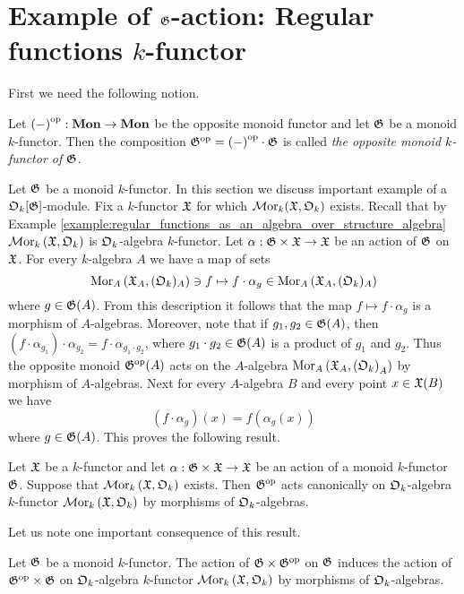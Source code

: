 \section{Example of ${\mathfrak G}$-action: Regular functions $k$-functor}
\noindent
First we need the following notion.

\begin{definition}
Let $\left(-\right)^{\mathrm{op}}:\mathbf{Mon} \rightarrow \mathbf{Mon}$ be the opposite monoid functor and let ${\mathfrak G}$ be a monoid $k$-functor. Then the composition ${\mathfrak G}^{\mathrm{op}} = \left(-\right)^{\mathrm{op}}\cdot {\mathfrak G}$ is called \textit{the opposite monoid $k$-functor of ${\mathfrak G}$}.
\end{definition}
\noindent
Let ${\mathfrak G}$ be a monoid $k$-functor. In this section we discuss important example of a ${\mathfrak O}_k[{\mathfrak G}]$-module. Fix a $k$-functor ${\mathfrak X}$ for which $\mathcal{M}\mathrm{or}_k({\mathfrak X},{\mathfrak O}_k)$ exists. Recall that by Example \ref{example:regular_functions_as_an_algebra_over_structure_algebra} $\mathcal{M}\mathrm{or}_k\left({\mathfrak X},{\mathfrak O}_k\right)$ is ${\mathfrak O}_k$-algebra $k$-functor. Let $\alpha:{\mathfrak G}\times {\mathfrak X}\rightarrow {\mathfrak X}$ be an action of ${\mathfrak G}$ on ${\mathfrak X}$. For every $k$-algebra $A$ we have a map of sets
$$\mathrm{Mor}_A\left({\mathfrak X}_A,({\mathfrak O}_k)_A\right) \ni f\mapsto f\cdot \alpha_{g}\in \mathrm{Mor}_A\left({\mathfrak X}_A,({\mathfrak O}_k)_A\right)$$
where $g\in {\mathfrak G}(A)$. From this description it follows that the map $f\mapsto f\cdot \alpha_{g}$ is a morphism of $A$-algebras. Moreover, note that if $g_1,g_2\in {\mathfrak G}(A)$, then $\left(f\cdot \alpha_{g_1}\right)\cdot \alpha_{g_2} = f\cdot \alpha_{g_1\cdot g_2}$, where $g_1\cdot g_2 \in {\mathfrak G}(A)$ is a product of $g_1$ and $g_2$. Thus the opposite monoid ${\mathfrak G}^{\mathrm{op}}(A)$ acts on the $A$-algebra $\mathrm{Mor}_A\left({\mathfrak X}_A,\left({\mathfrak O}_k\right)_A\right)$ by morphism of $A$-algebras. Next for every $A$-algebra $B$ and every point $x\in {\mathfrak X}(B)$ we have
$$(f\cdot \alpha_{g})(x) = f\left(\alpha_{g}(x)\right)$$
where $g\in {\mathfrak G}(A)$. This proves the following result.

\begin{proposition}\label{proposition:action_on_regular_k_functor}
Let ${\mathfrak X}$ be a $k$-functor and let $\alpha:{\mathfrak G}\times {\mathfrak X} \rightarrow {\mathfrak X}$ be an action of a monoid $k$-functor ${\mathfrak G}$. Suppose that $\mathcal{M}\mathrm{or}_k\left({\mathfrak X},{\mathfrak O}_k\right)$ exists. Then ${\mathfrak G}^{\mathrm{op}}$ acts canonically on ${\mathfrak O}_k$-algebra $k$-functor $\mathcal{M}\mathrm{or}_k\left({\mathfrak X},{\mathfrak O}_k\right)$ by morphisms of ${\mathfrak O}_k$-algebras.
\end{proposition}
\noindent
Let us note one important consequence of this result.

\begin{corollary}\label{corollary:action_on_global_regular_functions_on_monoid}
Let ${\mathfrak G}$ be a monoid $k$-functor. The action of ${\mathfrak G}\times {\mathfrak G}^{\mathrm{op}}$ on ${\mathfrak G}$ induces the action of ${\mathfrak G}^{\mathrm{op}}\times {\mathfrak G}$ on ${\mathfrak O}_k$-algebra $k$-functor $\mathcal{M}\mathrm{or}_k\left({\mathfrak X},{\mathfrak O}_k\right)$ by morphisms of ${\mathfrak O}_k$-algebras.
\end{corollary}

